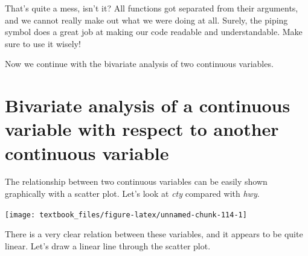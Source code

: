 \documentclass[]{tufte-book}
\newenvironment{Shaded}{}{}
\newcommand{\DataTypeTok}[1]{\textcolor[rgb]{0.56,0.13,0.00}{#1}}
\newcommand{\KeywordTok}[1]{\textcolor[rgb]{0.00,0.44,0.13}{\textbf{#1}}}
\newcommand{\NormalTok}[1]{#1}
\newcommand{\OperatorTok}[1]{\textcolor[rgb]{0.40,0.40,0.40}{#1}}
\newcommand{\StringTok}[1]{\textcolor[rgb]{0.25,0.44,0.63}{#1}}
\begin{document}
That's quite a mess, isn't it? All functions got separated from their arguments, and we cannot really make out what we were doing at all. Surely, the piping symbol does a great job at making our code readable and understandable. Make sure to use it wisely!

Now we continue with the bivariate analysis of two continuous variables.

\hypertarget{bivariate-analysis-of-a-continuous-variable-with-respect-to-another-continuous-variable}{%
\section{Bivariate analysis of a continuous variable with respect to another continuous variable}\label{bivariate-analysis-of-a-continuous-variable-with-respect-to-another-continuous-variable}}

The relationship between two continuous variables can be easily shown graphically with a scatter plot. Let's look at \emph{cty} compared with \emph{hwy}.

\begin{Shaded}
\end{Shaded}

\texttt{[image: textbook\_files/figure-latex/unnamed-chunk-114-1]}

There is a very clear relation between these variables, and it appears to be quite linear. Let's draw a linear line through the scatter plot.

\begin{Shaded}
\end{Shaded}
\end{document}
